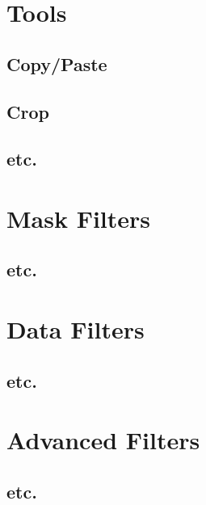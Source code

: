 \documentclass[fleqn,11pt,openany]{book}
\begin{document}
\section{Tools}

\subsection{Copy/Paste}

\subsection{Crop}

\subsection{etc.}

\section{Mask Filters}

\subsection{etc.}

\section{Data Filters}

\subsection{etc.}

\section{Advanced Filters}

\subsection{etc.}
\end{document}
